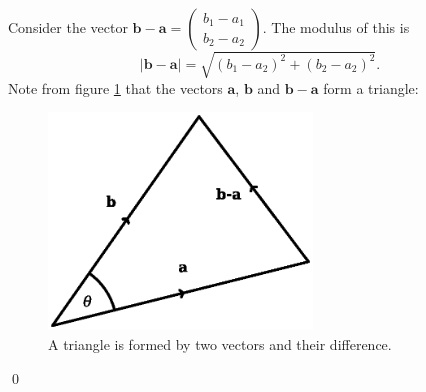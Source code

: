 \documentclass[12pt,a4paper]{article}
\newcommand{\gm}{0.625}
\newcommand{\gm}{0.5}
\newcommand{\nextalt}[1]{}
\theoremstyle{clearprint}
\renewenvironment{proof}[1][\proofname]
{\noindent{\bf {#1}.}\hspace*{1em}}%
{\qed\par}%
\newcommand{\bvec}[1]{\mathrm{\mathbf{#1}}}
\newcommand{\cvec}[2]{\begin{pmatrix} #1 \\ #2 \end{pmatrix}}
\newcommand{\vmod}[1]{\lvert #1 \rvert}
\begin{document}
\begin{proof}
Consider the vector \(\bvec{b} - \bvec{a} = \cvec{b_1 - a_1}{b_2 - a_2}\). The modulus of this is
\[
\vmod{\bvec{b} - \bvec{a}} = \sqrt{(b_1 - a_2)^2 + (b_2 - a_2)^2}.
\] 
Note from figure \ref{triangle} that the vectors \(\bvec{a}\), \(\bvec{b}\) and \(\bvec{b}-\bvec{a}\) form a triangle: 
\begin{figure}[!h]
\begin{center}
\nextalt{Two vectors, labelled a and b, are drawn as line segments. Their start points coincide and their end points do not. There is an acute angle of theta between them. Forming a triangle, a third line segment, labelled b-a is added. This vector starts at the end point of a and ends at the end point of b. Each line segment has an arrow on it pointing from the start point to the end point.}
\includegraphics[width=\gm\textwidth]{triangle.eps}
\end{center}
\caption{A triangle is formed by two vectors and their difference.}
\label{triangle}
\end{figure}


\end{proof}
\end{document}
